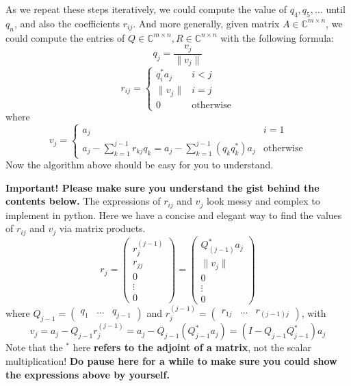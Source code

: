\noindent As we repeat these steps iteratively, we could compute the value of $q_4, q_5, \ldots$ until $q_n$, and also the coefficients \(r_{ij}\). And more generally, given matrix \(A \in \mathbb{C}^{m \times n}\), we could compute the entries of \(Q \in \mathbb{C}^{m \times  n}, R \in \mathbb{C}^{n \times  n}\) with the following formula:
\[
  q_j = \frac{v_{j}}{\|v_{j}\|}
\]
\[
  r_{ij} = \left\{
    \begin{array}{ll}
    q_{i}^{*}a_{j} & i < j\\
    \|v_{j}\| & i = j\\
    0 & \text{otherwise}
    \end{array}
  \right.
  \]
  where
  \[
    v_{j} = \left\{
      \begin{array}{ll}
        a_{j} & i = 1\\
        a_{j} - \sum_{k=1}^{j - 1} r_{kj}q_{k} = a_{j} - \sum_{k=1}^{j - 1} (q_{k}q_{k}^{*})a_{j} & \text{otherwise}
      \end{array}
      \right.
      \]
      Now the algorithm above should be easy for you to understand. \checked

\noindent \textbf{Important! Please make sure you understand the gist behind the contents below.}  The expressions of \(r_{ij}\) and \(v_j\) look messy and complex to implement in python. Here we have a concise and elegant way to find the values of \(r_{ij}\) and \(v_j\) via matrix products.
\[
  r_j = \begin{pmatrix} r_j^{(j - 1)} \\ r_{jj} \\ 0 \\ \vdots \\ 0\end{pmatrix} = \begin{pmatrix} Q_{(j - 1)}^{*}a_j \\ \|v_j\| \\ 0 \\ \vdots \\ 0\end{pmatrix}
  \]
  where \(Q_{j - 1} = \begin{pmatrix} 
  q_1 & \dots & q_{j - 1} 
\end{pmatrix} \) and \(r_j^{(j - 1)} = \begin{pmatrix} 
  r_{1j} & \dots & r_{(j-1)j}
\end{pmatrix} \), with   
\[
  v_j = a_j - Q_{j - 1}r_j^{(j - 1)} = a_j - Q_{j - 1}(Q_{j - 1}^{*}a_j) = (I - Q_{j - 1}Q_{j - 1}^{*})a_j
\]
Note that the \(^{*}\) here \textbf{refers to the adjoint of a matrix}, not the scalar multiplication!
\textbf{Do pause here for a while to make sure you could show the expressions above by yourself.} \medskip

